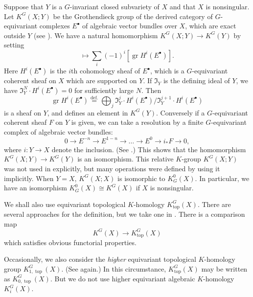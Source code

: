 \documentclass[12pt]{amsart}
\theoremstyle{definition}
\theoremstyle{remark}
\numberwithin{equation}{subsection}
\newcommand{\defeq}{\overset{\operatorname{\scriptstyle def.}}{=}}
\newcommand{\gr}{\operatorname{gr}} %
\newcommand{\idl}{\mathfrak I}
\newcommand{\Ktop}{K_{\operatorname{top}}}
\newcommand{\Kztop}{K_{0,\operatorname{top}}}
\newcommand{\Kotop}{K_{1,\operatorname{top}}}
\begin{document}
Suppose that $Y$ is a $G$-invariant closed subvariety of $X$ and that
$X$ is nonsingular. Let $K^G(X;Y)$ be the Grothendieck group of the
derived category of $G$-equivariant complexes $E^\bullet$ of
algebraic vector bundles over $X$, which are exact outside $Y$ (see
\cite[\S1]{BFM}).
%
We have a natural homomorphism $K^G(X;Y)\to K^G(Y)$ by setting
\begin{equation*}
  [E^\bullet] \mapsto \sum_i (-1)^i [\gr H^i(E^\bullet)].
\end{equation*}
Here $H^i(E^\bullet)$ is the $i$th cohomology sheaf of $E^\bullet$,
which is a $G$-equivariant coherent sheaf on $X$ which are supported
on $Y$.
%
If $\idl_Y$ is the defining ideal of $Y$, we have
$\idl_Y^N\cdot H^i(E^\bullet) = 0$ for sufficiently large $N$. Then
\begin{equation*}
   \gr H^i(E^\bullet) \defeq
   \bigoplus_j \idl_Y^j\cdot H^i(E^\bullet)/ \idl_Y^{j+1}\cdot H^i(E^\bullet)
\end{equation*}
is a sheaf on $Y$, and defines an element in $K^G(Y)$.
%
Conversely if a $G$-equivariant coherent sheaf
$F$ on $Y$ is given, we can take a resolution by
a finite $G$-equivariant complex of algebraic vector bundles:
\begin{equation*}
  0 \to E^{-n} \to E^{1-n} \to \dots \to E^0 \to i_* F \to 0,
\end{equation*}
where $i\colon Y\to X$ denote the inclusion. (See \cite[5.1.28]{Gi-book}.)
This shows that the homomorphism $K^G(X;Y)\to K^G(Y)$ is an
isomorphism. This relative $K$-group $K^G(X;Y)$ was not used in
\cite{Gi-book} explicitly, but many operations were defined by using it
implicitly.
%
When $Y = X$, $K^G(X;X)$ is isomorphic to $K_G^0(X)$. In particular,
we have an isomorphism $K_G^0(X) \cong K^G(X)$ if $X$ is
nonsingular.

We shall also use equivariant topological $K$-homology
$\Ktop^G(X)$. There are several approaches for the definition, but we
take one in \cite[5.3]{T-top}. There is a comparison map
\begin{equation*}
   K^G(X) \to \Ktop^G(X)
\end{equation*}
which satisfies obvious functorial properties.

Occasionally, we also consider the {\it higher\/} equivariant
topological $K$-homology group $\Kotop^G(X)$. (See \cite[5.3]{T-top}
again.)
%
In this circumstance, $\Ktop^G(X)$ may be written as $\Kztop^G(X)$.
%
But we do not use higher equivariant algebraic $K$-homology
$K^G_i(X)$.
\end{document}
